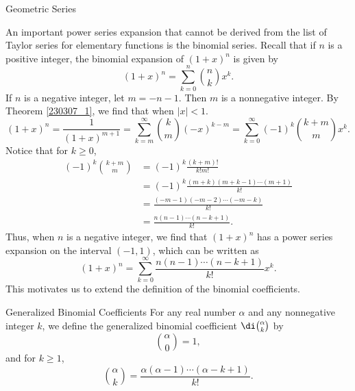 \begin{example}[label=230305_16]{Geometric Series}
\begin{example}[label=230304_9]{}
\begin{example}{}
An important power series expansion that cannot be derived from the list of Taylor series for elementary functions is the binomial series. Recall that if $n$ is a positive integer, 
the binomial expansion of $(1+x)^n$ is given by
\[(1+x)^n=\sum_{k=0}^n\binom{n}{k}x^k.\]If $n$ is a negative integer, let $m=-n-1$. Then $m$ is a nonnegative integer. By Theorem \ref{230307_1}, we find that when $|x|<1$.
\[
(1+x)^n =\frac{1}{(1+x)^{m+1}}=\sum_{k=m}^{\infty}\binom{k}{m}(-x)^{k-m} =\sum_{k=0}^{\infty}(-1)^{k}\binom{k+m}{m}x^k.\]
Notice that for $k\geq 0$,
\begin{align*}
(-1)^{k}\binom{k+m}{m}
&=(-1)^{k}\frac{(k+m)!}{k!m!}\\
&=(-1)^{k}\frac{(m+k)(m+k-1)\cdots (m+1)}{k!}\\
&=\frac{(-m-1)(-m-2)\cdots (-m-k)}{k!}\\
&=\frac{n(n-1)\cdots (n-k+1)}{k!}.
\end{align*}Thus, when $n$ is a negative integer, we find that $(1+x)^n$ has a power series expansion on the interval $(-1,1)$,  which can be written as
\[(1+x)^n=\sum_{k=0}^{\infty}\frac{n(n-1)\cdots (n-k+1)}{k!}x^k.\]
This motivates us to extend the definition of the binomial coefficients.
\begin{definition}{Generalized Binomial Coefficients}
For any real number $\alpha$ and any nonnegative integer $k$, we define the generalized binomial coefficient $\di\binom{\alpha}{k}$ by
\[\binom{\alpha}{0}=1,\] and for $k\geq 1$,
\[\binom{\alpha}{k}=\frac{\alpha(\alpha-1)\cdots(\alpha-k+1)}{k!}.\]
\end{definition}


\end{example}
\end{example}
\end{example}
